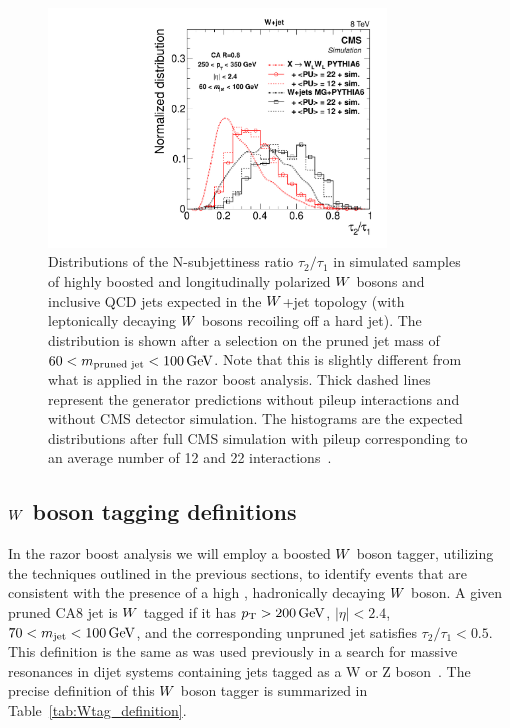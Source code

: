 \begin{figure}[htb]
  \centering
  \includegraphics[width=0.8\textwidth]{figures/razor_wtag/tau2tau1_afterMass}
  \caption{Distributions of the N-subjettiness ratio $\tau_2 / \tau_1$ in simulated samples of
highly boosted and longitudinally polarized $W$ bosons and inclusive QCD jets expected in the
$W$+jet topology (\ie with leptonically decaying $W$ bosons recoiling off a hard jet). 
The distribution is shown after a selection on the pruned jet mass of $60 < m_{\textrm{pruned jet}}
< 100 \,\text{Ge\hspace{-.08em}V}$. Note that this is slightly different from what is applied in the razor boost analysis.
Thick dashed lines represent the generator predictions without pileup interactions and without CMS
detector simulation. The histograms are the expected distributions after full CMS simulation with
pileup corresponding to an average number of 12 and 22 interactions~\cite{Khachatryan:2014vla}. 
  \label{fig:boost_wtag_tau2tau1}}
\end{figure}



\subsection{\texorpdfstring{$W$}{W} boson tagging definitions}

In the razor boost analysis we will employ a boosted $W$ boson tagger, utilizing the techniques
outlined in the previous sections, to identify events that are consistent with the presence of a
high \pt, hadronically decaying $W$ boson. 
A given pruned CA8 jet is $W$ tagged if it has $p_{\mathrm{T}} > 200\,\text{Ge\hspace{-.08em}V}$, $|\eta|<2.4$, $70 < m_\textrm{jet}
< 100\,\text{Ge\hspace{-.08em}V}$, and the corresponding unpruned jet satisfies $\tau_2 / \tau_1 < 0.5$.
This definition is the same as was used previously in a search for massive resonances in dijet
systems containing jets tagged as a W or Z boson~\cite{EXO-12-024,EXO-13-009}. 
The precise definition of this $W$ boson tagger is summarized in Table~\ref{tab:Wtag_definition}.

